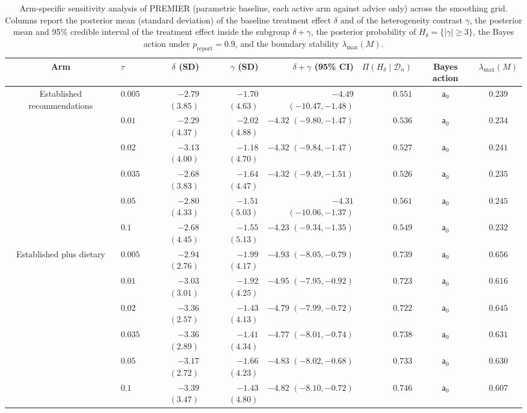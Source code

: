 \documentclass[11pt]{article}
\theoremstyle{definition}
\theoremstyle{plain}
\begin{document}
\begin{table}[!htbp]
  \centering
  \caption{Arm-specific sensitivity analysis of PREMIER (parametric baseline, each active arm against advice only) across the smoothing grid. Columns report the posterior mean (standard deviation) of the baseline treatment effect $\delta$ and of the heterogeneity contrast $\gamma$, the posterior mean and 95\% credible interval of the treatment effect inside the subgroup $\delta+\gamma$, the posterior probability of $H_\delta=\{|\gamma|\ge3\}$, the Bayes action under $p_{\mathrm{report}}=0.9$, and the boundary stability $\lambda_{\max}(M)$.}
  \label{tab:premier_arms}
  \begin{adjustbox}{max width=\textwidth}
  \begin{tabular}{clrrrrcc}
    \toprule
    Arm & $\tau$ & $\delta$ (SD) & $\gamma$ (SD) & $\delta+\gamma$ (95\% CI) & $\Pi(H_\delta\mid\mathcal D_n)$ & Bayes action & $\lambda_{\max}(M)$\\
    \midrule
    \multirow{6}{*}{Established recommendations}
      & $0.005$ & $-2.79$ $(3.85)$ & $-1.70$ $(4.63)$ & $-4.49$ $(-10.47, -1.48)$ & $0.551$ & $\mathsf{a}_0$ & $0.239$\\
      & $0.01$  & $-2.29$ $(4.37)$ & $-2.02$ $(4.88)$ & $-4.32$ $(-9.80, -1.47)$ & $0.536$ & $\mathsf{a}_0$ & $0.234$\\
      & $0.02$  & $-3.13$ $(4.00)$ & $-1.18$ $(4.70)$ & $-4.32$ $(-9.84, -1.47)$ & $0.527$ & $\mathsf{a}_0$ & $0.241$\\
      & $0.035$ & $-2.68$ $(3.83)$ & $-1.64$ $(4.47)$ & $-4.32$ $(-9.49, -1.51)$ & $0.526$ & $\mathsf{a}_0$ & $0.235$\\
      & $0.05$  & $-2.80$ $(4.33)$ & $-1.51$ $(5.03)$ & $-4.31$ $(-10.06, -1.37)$ & $0.561$ & $\mathsf{a}_0$ & $0.245$\\
      & $0.1$   & $-2.68$ $(4.45)$ & $-1.55$ $(5.13)$ & $-4.23$ $(-9.34, -1.35)$ & $0.549$ & $\mathsf{a}_0$ & $0.232$\\
    \midrule
    \multirow{6}{*}{Established plus dietary}
      & $0.005$ & $-2.94$ $(2.76)$ & $-1.99$ $(4.17)$ & $-4.93$ $(-8.05, -0.79)$ & $0.739$ & $\mathsf{a}_0$ & $0.656$\\
      & $0.01$  & $-3.03$ $(3.01)$ & $-1.92$ $(4.25)$ & $-4.95$ $(-7.95, -0.92)$ & $0.723$ & $\mathsf{a}_0$ & $0.616$\\
      & $0.02$  & $-3.36$ $(2.57)$ & $-1.43$ $(4.13)$ & $-4.79$ $(-7.99, -0.72)$ & $0.722$ & $\mathsf{a}_0$ & $0.645$\\
      & $0.035$ & $-3.36$ $(2.89)$ & $-1.41$ $(4.34)$ & $-4.77$ $(-8.01, -0.74)$ & $0.738$ & $\mathsf{a}_0$ & $0.631$\\
      & $0.05$  & $-3.17$ $(2.72)$ & $-1.66$ $(4.23)$ & $-4.83$ $(-8.02, -0.68)$ & $0.733$ & $\mathsf{a}_0$ & $0.630$\\
      & $0.1$   & $-3.39$ $(3.47)$ & $-1.43$ $(4.80)$ & $-4.82$ $(-8.10, -0.72)$ & $0.746$ & $\mathsf{a}_0$ & $0.607$\\
    \bottomrule
  \end{tabular}
  \end{adjustbox}
\end{table}
\end{document}
